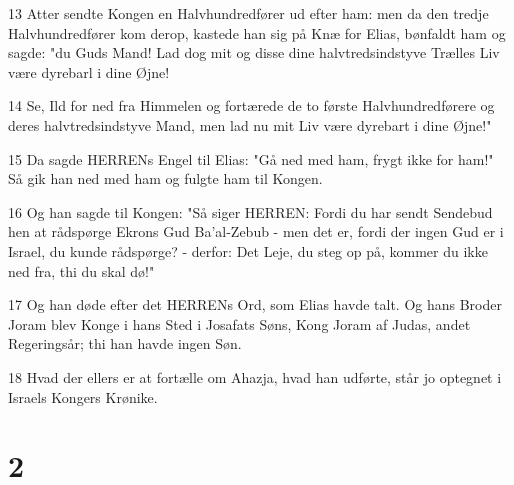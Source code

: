 \par 13 Atter sendte Kongen en Halvhundredfører ud efter ham: men da den tredje Halvhundredfører kom derop, kastede han sig på Knæ for Elias, bønfaldt ham og sagde: "du Guds Mand! Lad dog mit og disse dine halvtredsindstyve Trælles Liv være dyrebarl i dine Øjne!
\par 14 Se, Ild for ned fra Himmelen og fortærede de to første Halvhundredførere og deres halvtredsindstyve Mand, men lad nu mit Liv være dyrebart i dine Øjne!"
\par 15 Da sagde HERRENs Engel til Elias: "Gå ned med ham, frygt ikke for ham!" Så gik han ned med ham og fulgte ham til Kongen.
\par 16 Og han sagde til Kongen: "Så siger HERREN: Fordi du har sendt Sendebud hen at rådspørge Ekrons Gud Ba'al-Zebub - men det er, fordi der ingen Gud er i Israel, du kunde rådspørge? - derfor: Det Leje, du steg op på, kommer du ikke ned fra, thi du skal dø!"
\par 17 Og han døde efter det HERRENs Ord, som Elias havde talt. Og hans Broder Joram blev Konge i hans Sted i Josafats Søns, Kong Joram af Judas, andet Regeringsår; thi han havde ingen Søn.
\par 18 Hvad der ellers er at fortælle om Ahazja, hvad han udførte, står jo optegnet i Israels Kongers Krønike.

\chapter{2}

